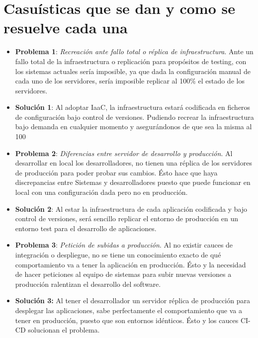 \section{Casuísticas que se dan y como se resuelve cada una}
		\begin{itemize}
			\item \textbf{Problema 1}: \textit{Recreación ante fallo total o réplica de infraestructura}. Ante un fallo total de la infraestructura o replicación para propósitos de testing, con los sistemas actuales sería imposible, ya que dada la configuración manual de cada uno de los servidores, sería imposible replicar al 100\% el estado de los servidores. 
			
			\item  \textbf {Solución 1}: Al adoptar IaaC, la infraestructura estará codificada en ficheros de configuración bajo control de versiones. Pudiendo recrear la infraestructura bajo demanda en cualquier momento y asegurándonos de que sea la misma al 100%
			
			\item \textbf{Problema 2}: \textit{Diferencias entre servidor de desarrollo y producción}. Al desarrollar en local los desarrolladores, no tienen una réplica de los servidores de producción para poder probar sus cambios. Ésto hace que haya discrepancias entre Sistemas y desarrolladores puesto que puede funcionar en local con una configuración dada pero no en producción. 
			
			\item \textbf {Solución 2}: Al estar la infraestructura de cada aplicación codificada y bajo control de versiones, será sencillo replicar el entorno de producción en un entorno test para el desarrollo de aplicaciones.
			
			\item \textbf{Problema 3}: \textit{Petición de subidas a producción}. Al no existir cauces de integración o despliegue, no se tiene un conocimiento exacto de qué comportamiento va a tener la aplicación en producción. Ésto y la necesidad de hacer peticiones al equipo de sistemas para subir nuevas versiones a producción ralentizan el desarrollo del software.
			
			\item \textbf{Solución 3:} Al tener el desarrollador un servidor réplica de producción para desplegar las aplicaciones, sabe perfectamente el comportamiento que va a tener en producción, puesto que son entornos idénticos. Ésto y los cauces CI-CD solucionan el problema.
			

\end{itemize}

